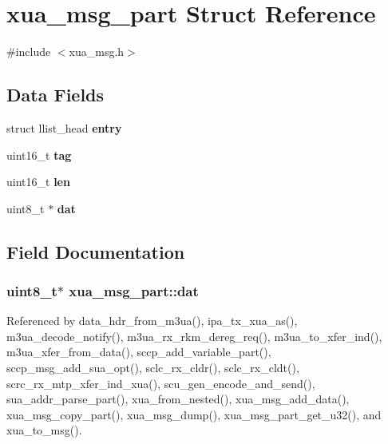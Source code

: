\section{xua\+\_\+msg\+\_\+part Struct Reference}
\label{structxua__msg__part}


{\ttfamily \#include $<$xua\+\_\+msg.\+h$>$}

\subsection*{Data Fields}
\begin{DoxyCompactItemize}
\item 
struct llist\+\_\+head {\bf entry}
\item 
uint16\+\_\+t {\bf tag}
\item 
uint16\+\_\+t {\bf len}
\item 
uint8\+\_\+t $\ast$ {\bf dat}
\end{DoxyCompactItemize}


\subsection{Field Documentation}
\subsubsection[{dat}]{\setlength{\rightskip}{0pt plus 5cm}uint8\+\_\+t$\ast$ xua\+\_\+msg\+\_\+part\+::dat}\label{structxua__msg__part_a4a99d515a4ea7b6ca06882f2db6e7617}


Referenced by data\+\_\+hdr\+\_\+from\+\_\+m3ua(), ipa\+\_\+tx\+\_\+xua\+\_\+as(), m3ua\+\_\+decode\+\_\+notify(), m3ua\+\_\+rx\+\_\+rkm\+\_\+dereg\+\_\+req(), m3ua\+\_\+to\+\_\+xfer\+\_\+ind(), m3ua\+\_\+xfer\+\_\+from\+\_\+data(), sccp\+\_\+add\+\_\+variable\+\_\+part(), sccp\+\_\+msg\+\_\+add\+\_\+sua\+\_\+opt(), sclc\+\_\+rx\+\_\+cldr(), sclc\+\_\+rx\+\_\+cldt(), scrc\+\_\+rx\+\_\+mtp\+\_\+xfer\+\_\+ind\+\_\+xua(), scu\+\_\+gen\+\_\+encode\+\_\+and\+\_\+send(), sua\+\_\+addr\+\_\+parse\+\_\+part(), xua\+\_\+from\+\_\+nested(), xua\+\_\+msg\+\_\+add\+\_\+data(), xua\+\_\+msg\+\_\+copy\+\_\+part(), xua\+\_\+msg\+\_\+dump(), xua\+\_\+msg\+\_\+part\+\_\+get\+\_\+u32(), and xua\+\_\+to\+\_\+msg().

